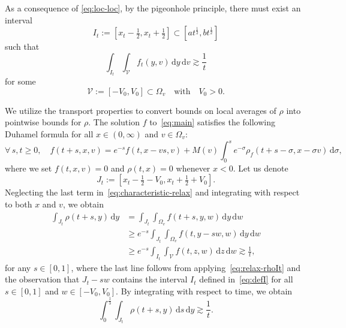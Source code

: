 \documentclass[11pt]{amsart}
\theoremstyle{definition}
\theoremstyle{remark}
\numberwithin{equation}{section}
\def\VV{{\mathcal V}}
\newcommand{\dd}{{\, \mathrm d}}
\begin{document}
As a consequence of  \eqref{eq:loc-loc},
 by the pigeonhole principle, there must exist an interval
\begin{equation}
  \label{eq:defI}
  I_t := \left[x_t - \tfrac12,x_t+ \tfrac12 \right] \subset \left[at^{\frac{1}{2}},bt^{\frac{1}{2}}\right]
\end{equation}
such that
\begin{equation}
  \label{eq:relax-rhoIt}
  \int_{I_t} \int_{\VV} f_t(y,v) \dd y \dd v \gtrsim  \frac{1}{t}
\end{equation}
for some
\begin{equation*}
  \VV := [-V_0,V_0] \subset \Omega_v \quad \text{with} \quad V_0>0.
\end{equation*}

We utilize the transport properties to convert bounds on local averages of $\rho$ into pointwise bounds for $\rho$. The solution $f$ to~\eqref{eq:main} satisfies the following Duhamel formula for all $x \in (0, \infty)$ and $v \in \Omega_v$:
\begin{equation}
  \label{eq:characteristic-relax}
  \forall \, s, t \ge 0, \quad f(t+s, x, v) = e^{-s} f(t, x - v s, v) + M(v) \int_0^s e^{-\sigma} \rho_f(t + s - \sigma, x - \sigma v) \, \mathrm{d}\sigma,
\end{equation}
where we set $f(t, x, v) = 0$ and $\rho(t,x)=0$ whenever $x < 0$. Let us denote
\begin{equation*}
  J_t := \left[x_t-\tfrac12 -V_0,x_t+\tfrac12+ V_0 \right].
\end{equation*}
Neglecting the last term in~\eqref{eq:characteristic-relax} and integrating with respect to both $x$ and $v$, we obtain
\begin{align*}
  \int_{J_t} \rho (t+s,y) \dd y
  &= \int_{J_t} \int_{\Omega_v} f(t+s,y,w)  \dd y \dd w \\
  &\ge e^{-s} \int_{J_t} \int_{\Omega_v} f(t,y-sw,w) \dd y \dd w
  \\
  &\ge e^{-s} \int_{I_t} \int_{\VV} f(t,z,w) \dd z \dd w   \gtrsim \frac{1}{t},
\end{align*}
for any $s \in [0,1]$, where the last line follows from applying~\eqref{eq:relax-rhoIt} and the observation that $J_t - sw$ contains the interval $I_t$ defined in~\eqref{eq:defI} for all $s \in [0,1]$ and $w \in [-V_0, V_0]$. By integrating with respect to time, we obtain
\begin{equation*}
  \int_{0}^{\tfrac13} \!\! \int_{J_t} \rho (t+s,y) \dd s  \dd y \gtrsim \frac{1}{t}.
\end{equation*}
\end{document}
